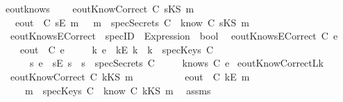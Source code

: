 \begin{isabellebody}
eout{\isacharunderscore}know{\isacharunderscore}s{\isacharcolon}\ \isanewline
\ \ \ {\isachardoublequoteopen}eoutKnowCorrect\ C\ {\isacharparenleft}sKS\ m{\isacharparenright}\ {\isacharequal}\ \isanewline
\ \ {\isacharparenleft}{\isacharparenleft}eout\ \ C\ {\isacharparenleft}sE\ m{\isacharparenright}{\isacharparenright}\ {\isasymlongleftrightarrow}\ \ {\isacharparenleft}m\ {\isasymin}\ {\isacharparenleft}specSecrets\ C{\isacharparenright}\ {\isasymor}\ {\isacharparenleft}know\ C\ {\isacharparenleft}sKS\ m{\isacharparenright}{\isacharparenright}{\isacharparenright}\ {\isacharparenright}{\isachardoublequoteclose}\isanewline
\isanewline
{}\isamarkupfalse%
\ eoutKnowsECorrect\ {\isacharcolon}{\isacharcolon}\ {\isachardoublequoteopen}specID\ {\isasymRightarrow}\ Expression\ {\isasymRightarrow}\ bool{\isachardoublequoteclose}\isanewline
{}\isanewline
\ \ {\isachardoublequoteopen}eoutKnowsECorrect\ C\ e\ {\isasymequiv}\isanewline
\ \ \ {\isacharparenleft}{\isacharparenleft}eout\ \ C\ e{\isacharparenright}\ {\isasymlongleftrightarrow}\isanewline
\ \ \ {\isacharparenleft}{\isacharparenleft}{\isasymexists}\ k{\isachardot}\ e\ {\isacharequal}\ {\isacharparenleft}kE\ k{\isacharparenright}\ {\isasymand}\ {\isacharparenleft}k\ {\isasymin}\ specKeys\ C{\isacharparenright}{\isacharparenright}\ {\isasymor}\ \isanewline
\ \ \ \ {\isacharparenleft}{\isasymexists}\ s{\isachardot}\ e\ {\isacharequal}\ {\isacharparenleft}sE\ s{\isacharparenright}\ {\isasymand}\ {\isacharparenleft}s\ {\isasymin}\ specSecrets\ C{\isacharparenright}{\isacharparenright}\ {\isasymor}\isanewline
\ \ \ \ {\isacharparenleft}knows\ C\ {\isacharbrackleft}e{\isacharbrackright}{\isacharparenright}{\isacharparenright}{\isacharparenright}{\isachardoublequoteclose}\isanewline
\isanewline
{}\isamarkupfalse%
\ eoutKnowCorrect{\isacharunderscore}L{}k{\isacharcolon}\isanewline
{}\ {\isachardoublequoteopen}eoutKnowCorrect\ C\ {\isacharparenleft}kKS\ m{\isacharparenright}{\isachardoublequoteclose}\ \ \isanewline
\ \ \ \ \ \ \ \ {\isachardoublequoteopen}eout\ \ C\ {\isacharparenleft}kE\ m{\isacharparenright}{\isachardoublequoteclose}\isanewline
{}\ \ \ \ {\isachardoublequoteopen}m\ {\isasymin}\ {\isacharparenleft}specKeys\ C{\isacharparenright}\ {\isasymor}\ {\isacharparenleft}know\ C\ {\isacharparenleft}kKS\ m{\isacharparenright}{\isacharparenright}{\isachardoublequoteclose}\ \isanewline
%
\isadelimproof
%
\endisadelimproof
%
\isatagproof
{}\isamarkupfalse%
\ assms\ \isamarkupfalse%

\end{isabellebody}
